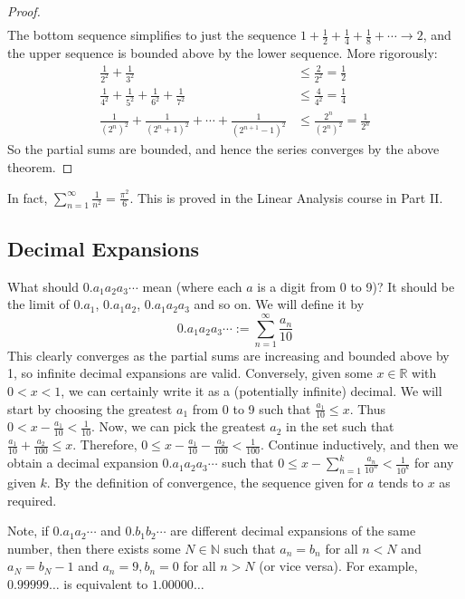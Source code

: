 \documentclass{article}
\begin{document}
\begin{proof}
\begin{align*}
		\end{align*}
		The bottom sequence simplifies to just the sequence $1 + \frac{1}{2} + \frac{1}{4} + \frac{1}{8} + \cdots \to 2$, and the upper sequence is bounded above by the lower sequence. More rigorously:
		\begin{align*}
			\frac{1}{2^2} + \frac{1}{3^2} &\leq \frac{2}{2^2} = \frac{1}{2} \\
			\frac{1}{4^2} + \frac{1}{5^2} + \frac{1}{6^2} + \frac{1}{7^2} &\leq \frac{4}{4^2} = \frac{1}{4} \\
			\frac{1}{(2^n)^2} + \frac{1}{(2^n + 1)^2} + \cdots + \frac{1}{(2^{n+1}-1)^2} &\leq \frac{2^n}{(2^n)^2} = \frac{1}{2^n}
		\end{align*}
		So the partial sums are bounded, and hence the series converges by the above theorem.
	\end{proof}
	In fact, $\sum_{n=1}^\infty \frac{1}{n^2} = \frac{\pi^2}{6}$. This is proved in the Linear Analysis course in Part II.

	\subsection{Decimal Expansions}
	What should $0.a_1a_2a_3\cdots$ mean (where each $a$ is a digit from 0 to 9)? It should be the limit of $0.a_1$, $0.a_1a_2$, $0.a_1a_2a_3$ and so on. We will define it by
	\[ 0.a_1a_2a_3\cdots := \sum_{n=1}^\infty \frac{a_n}{10} \]
	This clearly converges as the partial sums are increasing and bounded above by 1, so infinite decimal expansions are valid. Conversely, given some $x \in \mathbb R$ with $0 < x < 1$, we can certainly write it as a (potentially infinite) decimal. We will start by choosing the greatest $a_1$ from 0 to 9 such that $\frac{a_1}{10} \leq x$. Thus $0 < x - \frac{a_1}{10} < \frac{1}{10}$. Now, we can pick the greatest $a_2$ in the set such that $\frac{a_1}{10} + \frac{a_2}{100} \leq x$. Therefore, $0 \leq x - \frac{a_1}{10} - \frac{a_2}{100} < \frac{1}{100}$. Continue inductively, and then we obtain a decimal expansion $0.a_1a_2a_3\cdots$ such that $0 \leq x - \sum_{n=1}^k \frac{a_n}{10^n} < \frac{1}{10^k}$ for any given $k$. By the definition of convergence, the sequence given for $a$ tends to $x$ as required.

	Note, if $0.a_1a_2\cdots$ and $0.b_1b_2\cdots$ are different decimal expansions of the same number, then there exists some $N \in \mathbb N$ such that $a_n = b_n$ for all $n < N$ and $a_N = b_N - 1$ and $a_n = 9, b_n = 0$ for all $n > N$ (or vice versa). For example, $0.99999\dots$ is equivalent to $1.00000\dots$
\end{document}
